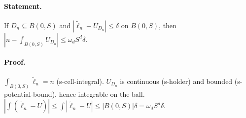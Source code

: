 \paragraph{Statement.} If $D_n\subseteq B(0,S)$ and $|\widetilde\ell_n-U_{D_n}|\leq\delta$ on $B(0,S)$, then $|n-\int_{B(0,S)}U_{D_n}|\leq\omega_dS^d\delta$.
\paragraph{Proof.} $\int_{B(0,S)}\widetilde\ell_n=n$ (s-cell-integral). $U_{D_n}$ is continuous (s-holder) and bounded (s-potential-bound), hence integrable on the ball.
$|\int(\widetilde\ell_n-U)|\leq\int|\widetilde\ell_n-U|\leq|B(0,S)|\delta=\omega_dS^d\delta$.
